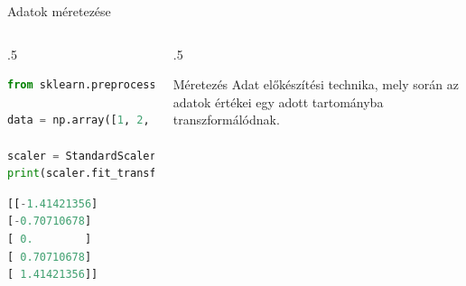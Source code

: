 \documentclass[english, aspectratio=169]{beamer}
\begin{document}
\begin{frame}[fragile]{Adatok méretezése}
	\begin{columns}
		\begin{column}{.5\textwidth}
			\begin{lstlisting}[language=python]
from sklearn.preprocessing import StandardScaler

data = np.array([1, 2, 3, 4, 5]).reshape(-1, 1)

scaler = StandardScaler()
print(scaler.fit_transform(data))
			\end{lstlisting}
			\begin{lstlisting}[language=python]
[[-1.41421356]
[-0.70710678]
[ 0.        ]
[ 0.70710678]
[ 1.41421356]]
			\end{lstlisting}            
		\end{column}
		\begin{column}{.5\textwidth}
			\begin{block}{Méretezés}
				Adat előkészítési technika, mely során az adatok értékei egy adott tartományba transzformálódnak.
			\end{block}
			\begin{center}
			\end{center}
		\end{column}
	\end{columns}
\end{frame}
\end{document}
